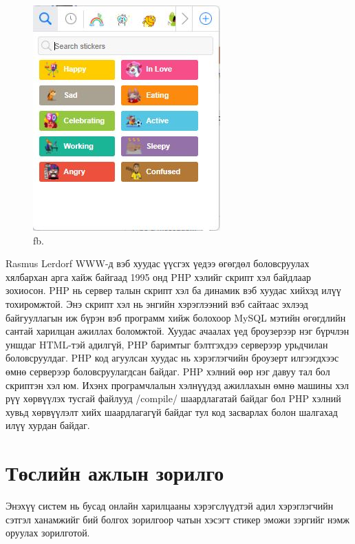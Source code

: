 \documentclass[12pt]{article}
\begin{document}
	\begin{figure}
		\includegraphics[width=\linewidth]{oor.jpg}
		\caption{fb.}
		\label{fig:bpmn1}
	\end{figure}
		Rasmus Lerdorf WWW-д вэб хуудас үүсгэх үедээ өгөгдөл боловсруулах хялбархан арга хайж байгаад 1995 онд PHP хэлийг скрипт хэл байдлаар зохиосон. PHP нь сервер талын скрипт хэл ба динамик вэб хуудас хийхэд илүү тохиромжтой. Энэ скрипт хэл нь энгийн хэрэглээний вэб сайтаас эхлээд байгууллагын иж бүрэн вэб программ хийж болохоор MySQL мэтийн өгөгдлийн сантай харилцан ажиллах боломжтой. Хуудас ачаалах үед броузерээр нэг бүрчлэн уншдаг HTML-тэй адилгүй, PHP баримтыг бэлтгэхдээ серверээр урьдчилан боловсруулдаг. PHP код агуулсан хуудас нь хэрэглэгчийн броузерт илгээгдхээс өмнө серверээр боловсруулагдсан байдаг. PHP хэлний өөр нэг давуу тал бол скриптэн хэл юм. Ихэнх програмчлалын хэлнүүдэд ажиллахын өмнө машины хэл рүү хөрвүүлэх тусгай файлууд /compile/ шаардлагатай байдаг бол PHP хэлний хувьд хөрвүүлэлт хийх шаардлагагүй байдаг тул код засварлах болон шалгахад илүү хурдан байдаг.
	\section{Төслийн ажлын зорилго}
	Энэхүү систем нь бусад онлайн харилцааны хэрэгслүүдтэй адил хэрэглэгчийн сэтгэл ханамжийг бий болгох зорилгоор чатын хэсэгт стикер эможи зэргийг нэмж оруулах зорилготой.
\end{document}
